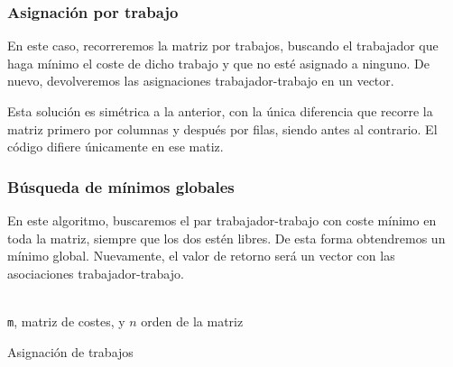 \documentclass[a4paper, 11pt]{article} %
\begin{document}
	
		\subsubsection{Asignación por trabajo}
		En este caso, recorreremos la matriz por trabajos, buscando el trabajador que haga mínimo el coste de dicho trabajo y que no esté asignado a ninguno. De nuevo, devolveremos las asignaciones trabajador-trabajo en un vector. 
		
		Esta solución es simétrica a la anterior, con la única diferencia que recorre la matriz  primero por columnas 
		y después por filas, siendo antes al contrario. El código difiere únicamente en ese matiz. 
		
		\subsubsection{Búsqueda de mínimos globales}
		En este algoritmo, buscaremos el par trabajador-trabajo con coste mínimo en toda la matriz, siempre que los dos estén 
		libres. De esta forma obtendremos un mínimo global. Nuevamente, el valor de retorno será un vector con las asociaciones
		trabajador-trabajo. 
		
		\begin{algorithm}[H]
			\begin{algorithmic}[1]
				\REQUIRE \ \\
					\texttt{m}, matriz de costes, y $n$ orden de la matriz\\
			           	     \ENDIF
			           	   \ENDIF
			             \ENDFOR
			           \ENDIF
			         \ENDFOR
			       \ENDFOR  	
				        
			\end{algorithmic}
			   \caption{Asignación de trabajos}
			   \label{Asignación Global}
		\end{algorithm}
		
\end{document}
